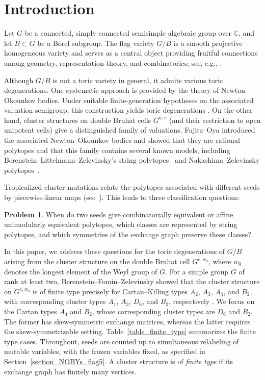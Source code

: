 \documentclass[10pt]{amsart}
\numberwithin{equation}{section}
\newcommand{\C}{{\mathbb{C}}}
\theoremstyle{plain}
\theoremstyle{definition}
\newtheorem{Problem}[theorem]{Problem}
\theoremstyle{remark}
\begin{document}
\section{Introduction}

Let $G$ be a connected, simply connected semisimple algebraic
group over $\C$, and let $B\subset G$ be a Borel subgroup.
The flag variety $G/B$ is a smooth projective homogeneous variety and serves as a central object providing fruitful connections among geometry, representation theory, and combinatorics; see, e.g., \cite{Brion_Lecture,Fulton97Young}.

Although $G/B$ is not a toric variety in general, it admits various toric degenerations. 
One systematic approach is provided by the theory of
Newton--Okounkov bodies.
Under suitable finite-generation hypotheses on the associated
valuation semigroup, this construction yields toric degenerations
\cite{An13,KK12,LM09}.
On the other hand, cluster structures on double Bruhat cells $G^{u,v}$ \cite{BFZ05} (and their restriction to open unipotent cells) give a distinguished family of valuations.
Fujita--Oya \cite{FujitaOya} introduced the associated Newton--Okounkov bodies and showed that they are rational polytopes and that this family contains several known models, including Berenstein--Littelmann--Zelevinsky's string polytopes~\cite{Littelmann98} and Nakashima--Zelevinsky polytopes~\cite{NZ97}. 

Tropicalized cluster mutations relate the polytopes
associated with different seeds by piecewise-linear maps (see~\cite{FujitaOya}).
This leads to three classification questions: 
\begin{Problem}
When do two seeds give combinatorially equivalent or
affine unimodularly equivalent polytopes, which classes
are represented by string polytopes, and which symmetries
of the exchange graph preserve these classes?
\end{Problem}


In this paper, we address these questions for the toric degenerations of $G/B$ arising from the cluster structure on the double Bruhat cell $G^{e,w_0}$, where $w_0$ denotes the longest element of the Weyl group of $G$.
For a simple group $G$ of rank at least two,
Berenstein--Fomin--Zelevinsky showed that the cluster structure
on $G^{e,w_0}$ is of finite type precisely for Cartan--Killing
types $A_2$, $A_3$, $A_4$, and $B_2$, with corresponding cluster
types $A_1$, $A_3$, $D_6$, and $B_2$, respectively
\cite[Proposition~2.26]{BFZ05}.
We focus on the Cartan types $A_4$ and $B_2$, whose
corresponding cluster types are $D_6$ and $B_2$.
The former has skew-symmetric exchange matrices, whereas
the latter requires the skew-symmetrizable setting.
Table~\ref{table_finite_type} summarizes the finite type cases.
Throughout, seeds are counted up to simultaneous relabeling
of mutable variables, with the frozen variables fixed,
as specified in Section~\ref{section_NOBYs_flag5}.
A cluster structure is of \emph{finite type}  if its exchange graph
has finitely many vertices.
\end{document}
